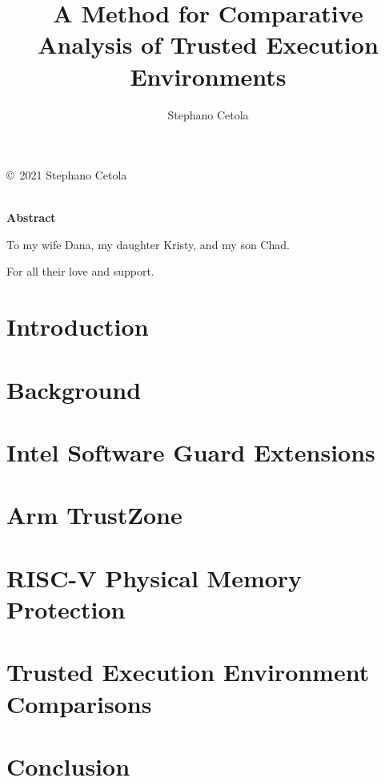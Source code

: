 \documentclass[12pt,oneside,letterpaper,hidelinks]{PSUreport}
\begin{document}
\title{A Method for Comparative Analysis of Trusted Execution Environments}
\subtitle{}
\author{Stephano Cetola}
\submitdate{\today}

\copyrightfalse
\figurespagetrue
\tablespagetrue
\beforepreface
{}
\null\vfill
\begin{center}
        \copyright\ 2021 Stephano Cetola \\
        \doclicenseLongText \\
        \vspace{5 mm}
        \doclicenseImage
\end{center}
\vfill\newpage
{}
\centerline{\textbf{Abstract}}

To my wife Dana, my daughter Kristy, and my son Chad.

\vspace{1cm}

\noindent For all their love and support.

\afterpreface

\printglossary
\printglossary[type=\acronymtype]


\glsresetall
\chapter{Introduction}
\label{chap:intro}


\glsresetall
\chapter{Background}
\label{chap:bg}


\glsresetall
\chapter{Intel Software Guard Extensions}
\label{chap:sgx}


\glsresetall
\chapter{Arm TrustZone}
\label{chap:trustzone}


\glsresetall
\chapter{RISC-V Physical Memory Protection}
\label{chap:pmp}


\glsresetall
\chapter{Trusted Execution Environment Comparisons}
\label{chap:comp}


\glsresetall
\chapter{Conclusion}
\label{chap:fini}




\end{document}
